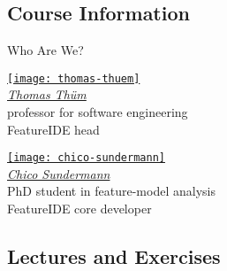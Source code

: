 \subsection{Course Information}

\begin{frame}{\myframetitle}
	\begin{note}{Who Are We?}
		\centering
		\parbox{0.45\linewidth}{
			\centering
			\href{https://www.dbse.ovgu.de/Mitarbeiter/Gunter+Saake.html}{\texttt{[image: thomas-thuem]}}\\[.5ex]
			\href{https://www.dbse.ovgu.de/Mitarbeiter/Gunter+Saake.html}{\emph{Thomas Thüm}}\\[.5ex]
			\small professor for software engineering\\[.5ex]
			FeatureIDE head
		}
		\parbox{0.45\linewidth}{
			\centering
			\href{https://www.dbse.ovgu.de/Mitarbeiter/Elias+Kuiter.html}{\texttt{[image: chico-sundermann]}}\\[.5ex]
			\href{https://www.dbse.ovgu.de/Mitarbeiter/Elias+Kuiter.html}{\emph{Chico Sundermann}}\\[.5ex]
			\small PhD student in feature-model analysis\\[.5ex]
			FeatureIDE core developer
		}
	\end{note}
\end{frame}

\subsection{Lectures and Exercises}

